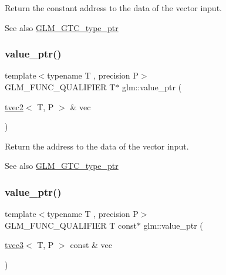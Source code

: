 Return the constant address to the data of the vector input. \begin{DoxySeeAlso}{See also}
\hyperlink{group__gtc__type__ptr}{G\+L\+M\+\_\+\+G\+T\+C\+\_\+type\+\_\+ptr} 
\end{DoxySeeAlso}
\mbox{\label{group__gtc__type__ptr_gabd3cc713184a2093862605f5f0abb8a4}} 
\subsubsection{\texorpdfstring{value\+\_\+ptr()}{value\_ptr()}\hspace{0.1cm}{\footnotesize\ttfamily [2/27]}}
{\footnotesize\ttfamily template$<$typename T , precision P$>$ \\
G\+L\+M\+\_\+\+F\+U\+N\+C\+\_\+\+Q\+U\+A\+L\+I\+F\+I\+ER T$\ast$ glm\+::value\+\_\+ptr (\begin{DoxyParamCaption}\item[{\hyperlink{structglm_1_1tvec2}{tvec2}$<$ T, P $>$ \&}]{vec }\end{DoxyParamCaption})}

Return the address to the data of the vector input. \begin{DoxySeeAlso}{See also}
\hyperlink{group__gtc__type__ptr}{G\+L\+M\+\_\+\+G\+T\+C\+\_\+type\+\_\+ptr} 
\end{DoxySeeAlso}
\mbox{\label{group__gtc__type__ptr_gac04db5d9c05bd3d50140f34f8695a08c}} 
\subsubsection{\texorpdfstring{value\+\_\+ptr()}{value\_ptr()}\hspace{0.1cm}{\footnotesize\ttfamily [3/27]}}
{\footnotesize\ttfamily template$<$typename T , precision P$>$ \\
G\+L\+M\+\_\+\+F\+U\+N\+C\+\_\+\+Q\+U\+A\+L\+I\+F\+I\+ER T const$\ast$ glm\+::value\+\_\+ptr (\begin{DoxyParamCaption}\item[{\hyperlink{structglm_1_1tvec3}{tvec3}$<$ T, P $>$ const \&}]{vec }\end{DoxyParamCaption})}


